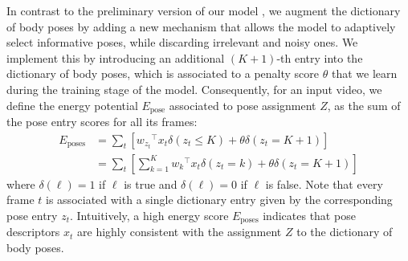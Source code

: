 In contrast to the preliminary version of our model \cite{Lillo2014}, we augment the 
dictionary of body poses by adding a new mechanism that allows the model to adaptively select 
informative poses, while discarding irrelevant and noisy ones. 
We implement this by
introducing an additional $(K+1)$-th entry into the dictionary of body poses, which is associated 
to a penalty score $\theta$ that we learn during the training stage of the model. Consequently, 
for an input video, we
define the energy potential $E_{\text{pose}}$ associated to pose assignment $Z$, as
the sum of the pose entry scores for all its frames:
\begin{equation} \label{Eq_poseEnergy}
\begin{split}
E_{\text{poses}} & = \sum_{t} \left[  {w_{z_t}}^\top x_{t}\delta(z_{t} \le  K) + \theta 
\delta(z_{t}=K+1)\right] \\
		& =  \sum_{t} \left[ \sum_{k=1}^K {w_k}^\top x_{t}\delta(z_{t} = k) + \theta \delta(z_{t}=K+1)\right]
\end{split}
\end{equation}
where $\delta(\ell) = 1$ if $\ell$ is true and $\delta(\ell) = 0$ if
$\ell$
is false. Note that every frame $t$ is associated with a single dictionary entry
given by the corresponding pose entry $z_t$.
Intuitively, a high energy score $E_{\text{poses}}$ indicates that
pose descriptors $x_t$ are highly consistent with the assignment $Z$
to the dictionary of body poses.


